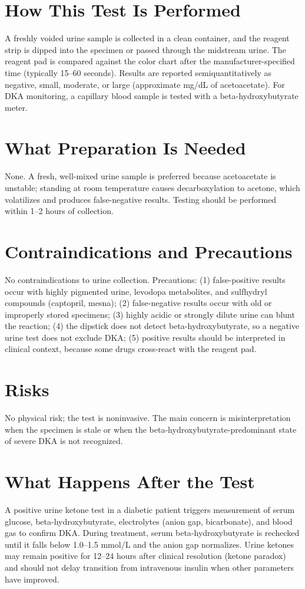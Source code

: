 \section*{How This Test Is Performed}
A freshly voided urine sample is collected in a clean container, and the reagent strip is dipped into the specimen or passed through the midstream urine. The reagent pad is compared against the color chart after the manufacturer-specified time (typically 15--60 seconds). Results are reported semiquantitatively as negative, small, moderate, or large (approximate mg/dL of acetoacetate). For DKA monitoring, a capillary blood sample is tested with a beta-hydroxybutyrate meter.
\section*{What Preparation Is Needed}
None. A fresh, well-mixed urine sample is preferred because acetoacetate is unstable; standing at room temperature causes decarboxylation to acetone, which volatilizes and produces false-negative results. Testing should be performed within 1--2 hours of collection.
\section*{Contraindications and Precautions}
No contraindications to urine collection. Precautions: (1) false-positive results occur with highly pigmented urine, levodopa metabolites, and sulfhydryl compounds (captopril, mesna); (2) false-negative results occur with old or improperly stored specimens; (3) highly acidic or strongly dilute urine can blunt the reaction; (4) the dipstick does not detect beta-hydroxybutyrate, so a negative urine test does not exclude DKA; (5) positive results should be interpreted in clinical context, because some drugs cross-react with the reagent pad.
\section*{Risks}
No physical risk; the test is noninvasive. The main concern is misinterpretation when the specimen is stale or when the beta-hydroxybutyrate-predominant state of severe DKA is not recognized.
\section*{What Happens After the Test}
A positive urine ketone test in a diabetic patient triggers measurement of serum glucose, beta-hydroxybutyrate, electrolytes (anion gap, bicarbonate), and blood gas to confirm DKA. During treatment, serum beta-hydroxybutyrate is rechecked until it falls below 1.0--1.5 mmol/L and the anion gap normalizes. Urine ketones may remain positive for 12--24 hours after clinical resolution (ketone paradox) and should not delay transition from intravenous insulin when other parameters have improved.
